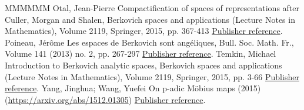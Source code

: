 \documentclass[11pt]{article}
\theoremstyle{definition}
\numberwithin{equation}{section}
\numberwithin{figure}{section}
\numberwithin{table}{section}
\begin{document}
\begin{thebibliography}{MMMMMM}
 Otal, Jean-Pierre Compactification of spaces of representations after Culler, Morgan and Shalen, Berkovich spaces and applications (Lecture Notes in Mathematics), Volume 2119, Springer, 2015, pp. 367-413 \href{https://ahl.centre-mersenne.org/item/AHL_2019__2__515_0/#otal}{Publisher reference}.
 Poineau, Jérôme Les espaces de Berkovich sont angéliques, Bull. Soc. Math. Fr., Volume 141 (2013) no. 2, pp. 267-297 \href{https://ahl.centre-mersenne.org/item/AHL_2019__2__515_0/#poineau}{Publisher reference}.
 Temkin, Michael Introduction to Berkovich analytic spaces, Berkovich spaces and applications (Lecture Notes in Mathematics), Volume 2119, Springer, 2015, pp. 3-66 \href{https://ahl.centre-mersenne.org/item/AHL_2019__2__515_0/#temkin}{Publisher reference}.
 Yang, Jinghua; Wang, Yuefei On p-adic Möbius maps (2015) (\url{https://arxiv.org/abs/1512.01305}) \href{https://ahl.centre-mersenne.org/item/AHL_2019__2__515_0/#yang-wang}{Publisher reference}.
\end{thebibliography}
\end{document}
